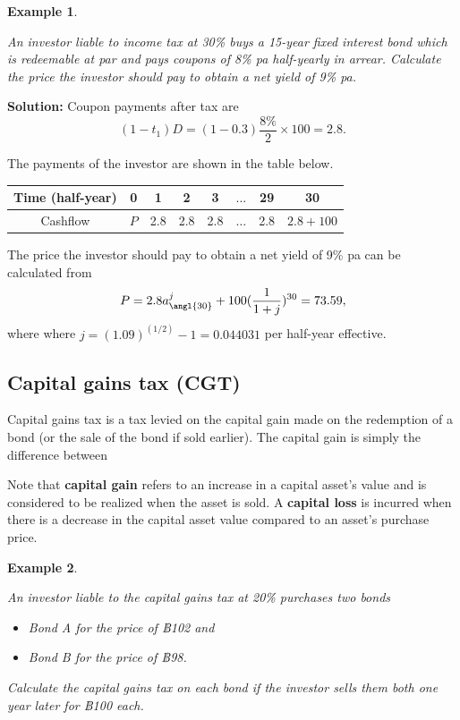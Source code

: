 \documentclass[landscape, 20pt]{extreport}
\theoremstyle{definition}
\theoremstyle{definition}
\newtheorem{example}{Example}[chapter]
\theoremstyle{definition}
\theoremstyle{definition}
\theoremstyle{remark}
\begin{document}
\newpage \begin{example}
\protect\hypertarget{exm:unlabeled-div-49}{}\label{exm:unlabeled-div-49}

\emph{An investor liable to income tax at 30\% buys a 15-year
fixed interest bond which is redeemable at par and pays coupons of 8\% pa
half-yearly in arrear. Calculate the price the investor should pay to
obtain a net yield of 9\% pa.}

\end{example}

\textbf{Solution:} Coupon payments after tax are
\[ (1 - t_1) D = (1 - 0.3) \frac{8\%}{2} \times 100 = 2.8.\]

The payments of the investor are shown in the table below.

\begin{longtable}[]{@{}cccccccc@{}}
\toprule
Time (half-year) & 0 & 1 & 2 & 3 & \(\ldots\) & 29 & 30 \\
\midrule
\endhead
Cashflow & \(P\) & 2.8 & 2.8 & 2.8 & \(\ldots\) & 2.8 & \(2.8 + 100\) \\
\bottomrule
\end{longtable}

The price the investor should pay to obtain a net yield of 9\% pa can be calculated from
\[P = 2.8 a^j_{\angl{30}} + 100 (\frac{1}{1+j})^{30} = 73.59,\]
where where \(j = (1.09)^{(1/2)} - 1 = 0.044031\) per half-year effective.

\hypertarget{capital-gains-tax-cgt}{%
\subsection{Capital gains tax (CGT)}\label{capital-gains-tax-cgt}}

Capital gains tax is a tax levied on the capital gain made on the
redemption of a bond (or the sale of the bond if sold earlier). The
capital gain is simply the difference between

Note that \textbf{capital gain} refers to an increase in a capital asset's value and is considered to be realized when the asset is sold. A \textbf{capital loss} is incurred when there is a decrease in the capital asset value compared to an asset's purchase price.

\newpage \begin{example}
\protect\hypertarget{exm:unlabeled-div-50}{}\label{exm:unlabeled-div-50}

\emph{An investor liable to the capital gains tax at 20\%
purchases two bonds}

\begin{itemize}
\item
  \emph{Bond A for the price of ฿102 and}
\item
  \emph{Bond B for the price of ฿98.}
\end{itemize}

\emph{Calculate the capital gains tax on each bond if the investor sells them
both one year later for ฿100 each.}

\end{example}
\end{document}
